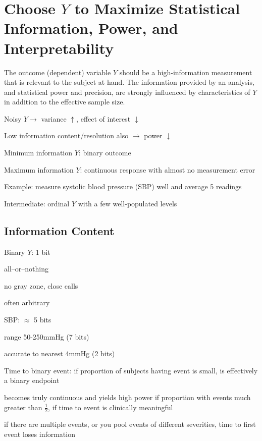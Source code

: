 \section{Choose $Y$ to Maximize Statistical Information, Power, and Interpretability}\label{sec:overview-ychoice}
The outcome (dependent) variable $Y$ should be a high-information 
measurement that is relevant to the subject at hand.  The information
provided by an analysis, and statistical power and precision, are
strongly influenced by characteristics of $Y$ in addition to the
effective sample size.
  \bi
  \item Noisy $Y \rightarrow$ variance $\uparrow$, effect of
    interest $\downarrow$
  \item Low information content/resolution also $\rightarrow$ power
    $\downarrow$ 
  \item Minimum information $Y$: binary outcome
  \item Maximum information $Y$: continuous response with almost no
    measurement error
    \bi
    \item Example: measure systolic blood pressure (SBP) well and
      average 5 readings 
    \ei
  \item Intermediate: ordinal $Y$ with a few well-populated levels
  \ei

\subsection{Information Content}\label{sec:overview-info-content}
  \bi
  \item Binary $Y$: 1 bit
    \bi
    \item all--or--nothing
    \item no gray zone, close calls
    \item often arbitrary
    \ei
  \item SBP: $\approx$ 5 bits
    \bi
    \item range 50-250mmHg (7 bits)
    \item accurate to nearest 4mmHg (2 bits)
    \ei
  \item Time to binary event: if proportion of subjects having event is
    small, is effectively a binary endpoint
    \bi
    \item becomes truly continuous and yields high power if proportion
      with events much greater than $\frac{1}{2}$, if time to event is
      clinically meaningful
    \item if there are multiple events, or you pool events of
      different severities, time to first event loses information
    \ei
  \ei
  
